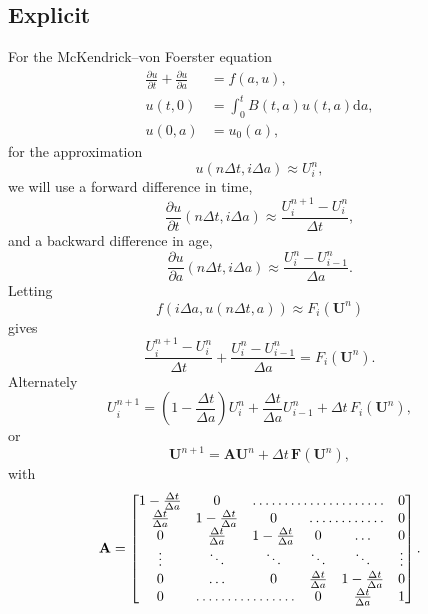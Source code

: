 \documentclass{article}
\renewcommand{\vec}[1]{\mathbf{#1}}
\newcommand{\mat}[1]{\mathbf{#1}}
\newcommand{\md}{\mathrm{d}}
\begin{document}
\subsection{Explicit}

For the McKendrick--von Foerster equation
\begin{equation}
  \begin{split}
    \frac{\partial u}{\partial t} + \frac{\partial u}{\partial a}
    &= f(a, u),
    \\
    u(t, 0) &= \int_0^t B(t, a) u(t, a) \md a,
    \\
    u(0, a) &= u_0(a),
  \end{split}
\end{equation}
for the approximation
\begin{equation}
  u(n \Delta t, i \Delta a) \approx U_i^n,
\end{equation}
we will use a forward difference in time,
\begin{equation}
  \frac{\partial u}{\partial t} (n \Delta t, i \Delta a)
  \approx
  \frac{U^{n + 1}_i - U^n_i}{\Delta t},
\end{equation}
and a backward difference in age,
\begin{equation}
  \frac{\partial u}{\partial a} (n \Delta t, i \Delta a)
  \approx
  \frac{U^n_i - U^n_{i - 1}}{\Delta a}.
\end{equation}
Letting
\begin{equation}
  f\left(i \Delta a, u(n \Delta t, a)\right)
  \approx F_i(\vec{U}^n)
\end{equation}
gives
\begin{equation}
  \frac{U^{n + 1}_i - U^n_i}{\Delta t}
  +
  \frac{U^n_i - U^n_{i - 1}}{\Delta a}
  = F_i(\vec{U}^n).
\end{equation}
Alternately
\begin{equation}
  U^{n + 1}_i
  =
  \left(1 - \frac{\Delta t}{\Delta a}\right)
  U^n_i
  +
  \frac{\Delta t}{\Delta a} U^n_{i - 1} + \Delta t \, F_i(\vec{U}^n),
\end{equation}
or
\begin{equation}
  \vec{U}^{n + 1}
  =
  \mat{A} \vec{U}^{n} + \Delta t \, \vec{F}(\vec{U}^n),
\end{equation}
with
\begin{equation}
  \mat{A} =
  \begin{bmatrix}
    1 - \frac{\Delta t}{\Delta a} & 0
    & \hdotsfor{3} & 0
    \\
    \frac{\Delta t}{\Delta a} & 1 - \frac{\Delta t}{\Delta a} & 0
    & \hdotsfor{2} & 0
    \\
    0 & \frac{\Delta t}{\Delta a} & 1 - \frac{\Delta t}{\Delta a} & 0
    & \hdots & 0
    \\
    \vdots & \ddots & \ddots & \ddots & \ddots & \vdots
    \\
    0 & \hdots & 0 & \frac{\Delta t}{\Delta a}  & 1 - \frac{\Delta
      t}{\Delta a} & 0
    \\
    0 & \hdotsfor{2} & 0 & \frac{\Delta t}{\Delta a} & 1
  \end{bmatrix}.
\end{equation}
\end{document}
